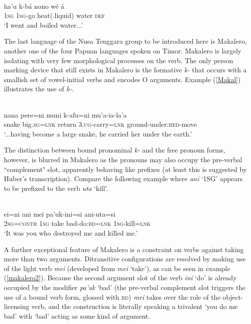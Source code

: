 \ea \label{tetun02}
\\
\gll ha'u k-bá nono wé á \\
\textsc{1}\textsc{sg} \textsc{1}\textsc{sg}-go heat(.liquid) water \textsc{def} \\
\glft `I went and boiled water...'
\z

The last language of the Nusa Tenggara group to be introduced here is Makalero, another one of the four Papuan languages spoken on Timor. Makalero is largely isolating with very few morphological processes on the verb. The only person marking device that still exists in Makalero is the formative \textit{k-} that occurs with a smallish set of vowel-initial verbs and encodes O arguments. Example (\ref{Makal}) illustrates the use of \textit{k-}.

\ea \label{Makal}
\\
\gll nana pere=ni muni k-afu=ni mu’a-ia-la’a \\
snake big.\textsc{sg}=\textsc{lnk} return \textsc{3}.\textsc{ug}-carry=\textsc{lnk} ground-under:\textsc{red}-move \\
\glft `...having become a large snake, he carried her under the earth.’ 
\z

The distinction between bound pronominal \textit{k-} and the free pronoun forms, however, is blurred in Makalero as the pronouns may also occupy the pre-verbal ``complement" slot, apparently behaving like prefixes (at least this is suggested by Huber's transcription). Compare the following example where \textit{ani} `1SG' appears to be prefixed to the verb \textit{uta} `kill'.

\ea \label{makalero2}
\\
\gll ei=ni ani mei pa’uk-ini=si ani-uta=si \\
\textsc{2}\textsc{sg}=\textsc{contr} \textsc{1}\textsc{sg} take bad-do:\textsc{bd}=\textsc{lnk} \textsc{1}\textsc{sg}-kill=\textsc{lnk} \\
\glft `It was you who destroyed me and killed me.’ 
\z

A further exceptional feature of Makalero is a constraint on verbs against taking more than two arguments. Ditransitive configurations are resolved by making use of the light verb \textit{mei} (developed from \textit{mei} `take'), as can be seen in example (\ref{makalero2}). Because the second argument slot of the verb \textit{ini} `do' is already occupied by the modifier \textit{pa'uk} `bad' (the pre-verbal complement slot triggers the use of a bound verb form, glossed with \textsc{bd}) \textit{mei} takes over the role of the object-licensing verb, and the construction is literally speaking a trivalent `you do me bad' with `bad' acting as some kind of argument.

